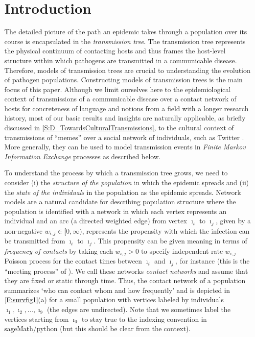 \documentclass[review]{elsarticle}
\numberwithin{equation}{section}
\let\orgautoref\autoref
\renewcommand{\autoref}
        {\def\equationautorefname{Eq.}%
         \def\figureautorefname{Fig.}%
         \def\subfigureautorefname{Fig.}%
         \def\sectionautorefname{Sect.}%
         \def\subsectionautorefname{Sect.}%
         \def\subsubsectionautorefname{Sect.}%
         \def\Itemautorefname{item}%
         \def\tableautorefname{Table}%
         \def\propositionautorefname{Prop.}%
         \def\corollaryautorefname{Corollary}%
         \def\theoremautorefname{Theorem}%
         \def\remarkautorefname{Remark}%
         \def\lemmaautorefname{Lemma}%
         \def\proofofautorefname{Proof}%
         \def\exampleautorefname{Example}%
         \orgautoref}
\begin{document}
\linenumbers

\section{Introduction}\label{sec:intro}

The detailed picture of the path an  epidemic takes through a population over its course is encapsulated in the {\em transmission tree}.  
The transmission tree represents the physical continuum of contacting hosts and thus frames the host-level structure within which pathogens are transmitted in a communicable disease.  
Therefore, models of transmission trees are crucial to understanding the evolution of pathogen populations.  Constructing models of transmission trees is the main focus of this paper.  
Although we limit ourselves here to the epidemiological context of transmissions of a communicable disease over a contact network of hosts for concreteness of language and notions from a field with a longer research history, 
most of our basic results and insights are naturally applicable, as briefly discussed in \autoref{S:D_TowardsCulturalTransmissions}, to the cultural context of transmissions of ``memes'' \citep[][p.~192]{Dawkins1976} over a social network of individuals, such as Twitter \citep{SolonWIREDHawkinsMeme2013}.  
More generally, they can be used to model transmission events in {\em Finite Markov Information Exchange} processes \citep[Sec.~2.2]{AldousIPSSSD2013} as described below.
    
To understand the process by which a transmission tree grows, we need to consider (i) the {\em structure of the population} in which the epidemic spreads and (ii) the {\em state of the individuals} in the population as the epidemic spreads.  
Network models are a natural candidate for describing population structure where the population is identified with a network in which each vertex represents an individual and an arc (a directed weighted edge) from vertex $\imath_i$ to $\imath_j$, given by a non-negative $w_{i,j} \in [0,\infty)$, represents the propensity with which the infection can be transmitted from $\imath_i$ to $\imath_j$.  
This propensity can be given meaning in terms of {\em frequency of contacts} by taking each $w_{i,j} > 0$ to specify independent rate-$w_{i,j}$ Poisson process for the contact times between $\imath_i$ and $\imath_j$, for instance (this is the ``meeting process'' of \cite{AldousIPSSSD2013}).  
We call these networks {\em contact networks} and assume that they are fixed or static through time.  
Thus, the contact network of a population summarizes `who can contact whom and how frequently' and is depicted in \autoref{F:survfig1}(a) for a small population with vertices labeled by individuals $\imath_1,\imath_2,\ldots,\imath_9$ (the edges are undirected). Note that we sometimes label the vertices starting from $\imath_0$ to stay true to the indexing convention in sageMath/python (but this should be clear from the context). 
\end{document}
